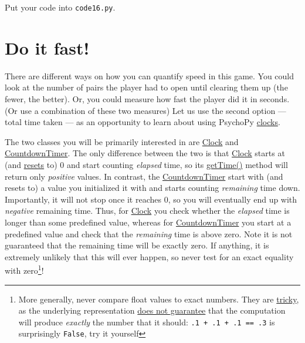 \documentclass[
]{book}
\begin{document}
Put your code into \texttt{code16.py}.

\hypertarget{do-it-fast}{%
\section{Do it fast!}\label{do-it-fast}}

There are different ways on how you can quantify speed in this game. You could look at the number of pairs the player had to open until clearing them up (the fewer, the better). Or, you could measure how fast the player did it in seconds. (Or use a combination of these two measures) Let us use the second option --- total time taken --- as an opportunity to learn about using PsychoPy \href{https://psychopy.org/api/clock.html}{clocks}.

The two classes you will be primarily interested in are \href{https://psychopy.org/api/clock.html\#psychopy.clock.Clock}{Clock} and \href{https://psychopy.org/api/clock.html\#psychopy.clock.CountdownTimer}{CountdownTimer}. The only difference between the two is that \href{https://psychopy.org/api/clock.html\#psychopy.clock.Clock}{Clock} starts at (and \href{https://psychopy.org/api/clock.html\#psychopy.clock.Clock.reset}{resets} to) 0 and start counting \emph{elapsed} time, so its \href{https://psychopy.org/api/clock.html\#psychopy.clock.MonotonicClock.getTime}{getTime()} method will return only \emph{positive} values. In contrast, the \href{https://psychopy.org/api/clock.html\#psychopy.clock.CountdownTimer}{CountdownTimer} start with (and resets to) a value you initialized it with and starts counting \emph{remaining} time down. Importantly, it will not stop once it reaches 0, so you will eventually end up with \emph{negative} remaining time. Thus, for \href{https://psychopy.org/api/clock.html\#psychopy.clock.Clock}{Clock} you check whether the \emph{elapsed} time is longer than some predefined value, whereas for \href{https://psychopy.org/api/clock.html\#psychopy.clock.CountdownTimer}{CountdownTimer} you start at a predefined value and check that the \emph{remaining} time is above zero. Note it is not guaranteed that the remaining time will be exactly zero. If anything, it is extremely unlikely that this will ever happen, so never test for an exact equality with zero\footnote{More generally, never compare float values to exact numbers. They are \href{http://www.lahey.com/float.htm}{tricky}, as the underlying representation \href{https://docs.python.org/3/tutorial/floatingpoint.html}{does not guarantee} that the computation will produce \emph{exactly} the number that it should: \texttt{.1\ +\ .1\ +\ .1\ ==\ .3} is surprisingly \texttt{False}, try it yourself}!
\end{document}
